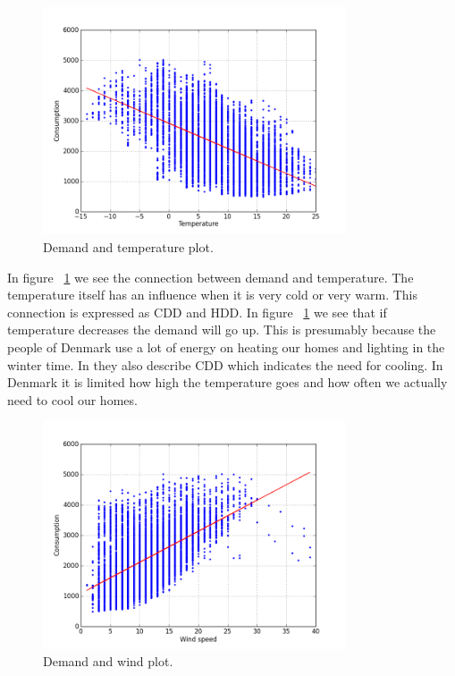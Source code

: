 \begin{figure}[H]
\centering
\includegraphics[width=0.8\textwidth ,natwidth=410,natheight=237]{billeder/energy_price_plots/consump_temp.png}
\caption{Demand and temperature plot.}
\label{fig:consump_temp}
\end{figure}


In figure ~\ref{fig:consump_temp} we see the connection between demand and temperature. The temperature itself has an influence when it is very cold or very warm. This connection is expressed as CDD and HDD. In figure ~\ref{fig:consump_temp} we see that if temperature decreases the demand will go up. This is presumably because the people of Denmark use a lot of energy on heating our homes and lighting in the winter time. In \cite{19} they also describe CDD which indicates the need for cooling. In Denmark it is limited how high the temperature goes and how often we actually need to cool our homes.

\begin{figure}[H]
\centering
\includegraphics[width=0.8\textwidth ,natwidth=410,natheight=237]{billeder/energy_price_plots/consump_wind.png}
\caption{Demand and wind plot.}
\label{fig:consump_wind}
\end{figure}

